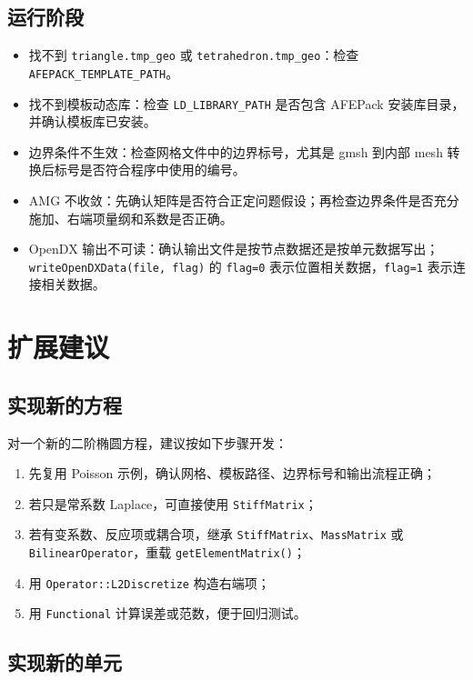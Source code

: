 \documentclass[UTF8,openany,zihao=-4,scheme=chinese]{ctexbook}
\newcommand{\file}[1]{\nolinkurl{#1}}
\newcommand{\class}[1]{\texttt{#1}}
\newcommand{\cmd}[1]{\texttt{#1}}
\begin{document}
\section{运行阶段}

\begin{itemize}[leftmargin=2em]
  \item 找不到 \file{triangle.tmp_geo} 或 \file{tetrahedron.tmp_geo}：检查 \cmd{AFEPACK\_TEMPLATE\_PATH}。
  \item 找不到模板动态库：检查 \cmd{LD\_LIBRARY\_PATH} 是否包含 AFEPack 安装库目录，并确认模板库已安装。
  \item 边界条件不生效：检查网格文件中的边界标号，尤其是 gmsh 到内部 mesh 转换后标号是否符合程序中使用的编号。
  \item AMG 不收敛：先确认矩阵是否符合正定问题假设；再检查边界条件是否充分施加、右端项量纲和系数是否正确。
  \item OpenDX 输出不可读：确认输出文件是按节点数据还是按单元数据写出；\class{writeOpenDXData(file, flag)} 的 \cmd{flag=0} 表示位置相关数据，\cmd{flag=1} 表示连接相关数据。
\end{itemize}

\chapter{扩展建议}

\section{实现新的方程}

对一个新的二阶椭圆方程，建议按如下步骤开发：

\begin{enumerate}[leftmargin=2em]
  \item 先复用 Poisson 示例，确认网格、模板路径、边界标号和输出流程正确；
  \item 若只是常系数 Laplace，可直接使用 \class{StiffMatrix}；
  \item 若有变系数、反应项或耦合项，继承 \class{StiffMatrix}、\class{MassMatrix} 或 \class{BilinearOperator}，重载 \class{getElementMatrix()}；
  \item 用 \class{Operator::L2Discretize} 构造右端项；
  \item 用 \class{Functional} 计算误差或范数，便于回归测试。
\end{enumerate}

\section{实现新的单元}
\end{document}
